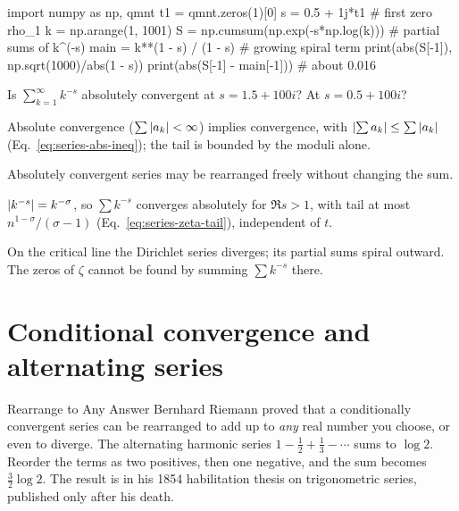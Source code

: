 \begin{pycode}
import numpy as np, qmnt
t1 = qmnt.zeros(1)[0]
s = 0.5 + 1j*t1                       # first zero rho_1
k = np.arange(1, 1001)
S = np.cumsum(np.exp(-s*np.log(k)))   # partial sums of k^(-s)
main = k**(1 - s) / (1 - s)           # growing spiral term
print(abs(S[-1]), np.sqrt(1000)/abs(1 - s))
print(abs(S[-1] - main[-1]))          # about 0.016
\end{pycode}

\begin{checkpoint}
Is $\sum_{k=1}^\infty k^{-s}$ absolutely convergent at $s=1.5+100i$? At $s=0.5+100i$?
\end{checkpoint}

\begin{keyideas}
\item Absolute convergence ($\sum\left\lvert a_k\right\rvert<\infty$) implies convergence, with $\left\lvert \sum a_k\right\rvert\le\sum\left\lvert a_k\right\rvert$ (Eq.~\eqref{eq:series-abs-ineq}); the tail is bounded by the moduli alone.
\item Absolutely convergent series may be rearranged freely without changing the sum.
\item $\left\lvert k^{-s}\right\rvert=k^{-\sigma}$, so $\sum k^{-s}$ converges absolutely for $\Re s>1$, with tail at most $n^{1-\sigma}/(\sigma-1)$ (Eq.~\eqref{eq:series-zeta-tail}), independent of $t$.
\item On the critical line the Dirichlet series diverges; its partial sums spiral outward. The zeros of $\zeta$ cannot be found by summing $\sum k^{-s}$ there.
\end{keyideas}

\section{Conditional convergence and alternating series}\label{sec:series-alternating}
\begin{didyouknow}{Rearrange to Any Answer}
Bernhard Riemann proved that a conditionally convergent series can be rearranged to add up to \emph{any} real number you choose, or even to diverge. The alternating harmonic series $1-\tfrac12+\tfrac13-\cdots$ sums to $\log 2$. Reorder the terms as two positives, then one negative, and the sum becomes $\tfrac32\log 2$. The result is in his 1854 habilitation thesis on trigonometric series, published only after his death.
\end{didyouknow}

